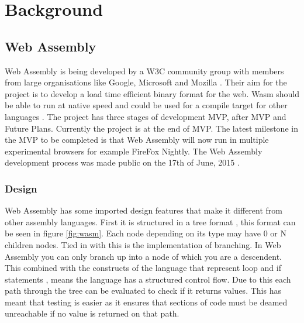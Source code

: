 \chapter{Background}\label{C:bg}


\section{Web Assembly}


Web Assembly is being developed by a W3C community group with members from large organisations like Google, Microsoft and Mozilla \cite{8_wagner_2016}. Their aim for the project is to develop a load time efficient binary format for the web. Wasm should be able to run at native speed and could be used for a compile target for other languages \cite{8_wagner_2016}. The project has three stages of development MVP, after MVP and Future Plans. Currently the project is  at the end of MVP. The latest milestone in the MVP to be completed is that Web Assembly will now run in multiple experimental browsers \cite{8_wagner_2016}\cite{7_zhu_2016} for example FireFox Nightly. The Web Assembly development process was made public on the 17th of June, 2015 \cite{6_bastien_2016}. 

\subsection{Design}\label{subsec:wad}

Web Assembly has some imported design features that make it different from other assembly languages. First it is structured in a tree format \cite{10_gohman_bastien_wagner_2016}, this format can be seen in figure \ref{fig:wasm}. Each node depending on its type may have 0 or N children nodes. Tied in with this is the implementation of branching. In Web Assembly you can only branch up into a node of which you are a descendent. This combined with the constructs of the language that represent loop and if statements \cite{11_webassembly/spec_2016}, means the language has a structured control flow. Due to this each path through the tree can be evaluated to check if it returns values. This has meant that testing is easier as it ensures that sections of code must be deamed unreachable if no value is returned on that path. 

